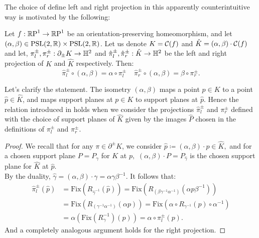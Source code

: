 The choice of define left and right projection in this apparently counterintuitive way is motivated by the following:

\begin{lemma}
    Let $f:\S\to\S$ be an orientation-preserving homeomorphism, and let $(\alpha, \beta)\in \PSL\times\PSL$. Let us denote $K=\CF$ and $\hat{K}=(\alpha,\beta)\cdot\CF$ and let, $\pi_l^{\pm},\pi_r^{\pm}:\partial_{\pm}K\to\H^2$ and $\hat{\pi}_l^\pm,\hat{\pi}_r^\pm:\hat{K}\to\H^2$ be the left and right projection of $K$ and $\hat{K}$ respectively. Then:
    \begin{equation}\label{equivariance}
        \hat{\pi}_l^\pm\circ(\alpha,\beta)=\alpha\circ\pi_l^\pm\;\;\;\ \hat{\pi}_r^\pm\circ(\alpha,\beta)=\beta\circ\pi_r^\pm.
    \end{equation}
\end{lemma}
Let's clarify the statement. The isometry $(\alpha,\beta)$ maps a point $p\in K$ to a point $\hat{p}\in\hat{K}$, and maps support planes at $p\in K$ to support planes at $\hat{p}$. Hence the relation introduced in  holds when we consider the projections $\hat{\pi}_l^\pm$ and $\pi_r^\pm$ defined with the choice of support planes of $\hat{K}$ given by the images $\hat{P}$ chosen in the definitions of $\pi_l^\pm$ and $\pi_r^\pm$.

\begin{proof}
    We recall that for any $\pi \in \partial^\pm K$, we consider $\hat{p}\coloneqq(\alpha,\beta)\cdot p\in\hat{K},$ and for a chosen support plane $P=P_\gamma$ for $K$ at $p,$ $(\alpha,\beta)\cdot P=P_{\hat{\gamma}}$ is the chosen support plane for $\hat{K}$ at $\hat{p}.$\\
    By the duality, $\hat{\gamma}=(\alpha,\beta)\cdot\gamma=\alpha\gamma\beta^{-1}.$ It follows that: 
    \begin{align*}
        \hat{\pi}_l^\pm(\hat{p}) &= \text{Fix}(R_{\hat{\gamma}^{-1}}(\hat{p}))=\text{Fix}(R_{(\beta\gamma^{-1}\alpha^{-1})}(\alpha p\beta^{-1}))\\
        &=\text{Fix}(R_{(\gamma^{-1}\alpha^{-1})}(\alpha p))=\text{Fix}(\alpha\circ R_{\gamma^{-1}}(p)\circ\alpha^{-1}) \\
        &=\alpha(\text{Fix}(R_\gamma^{-1})(p))=\alpha\circ\pi_l^\pm(p).
    \end{align*}
    And a completely analogous argument holds for the right projection.
\end{proof}

